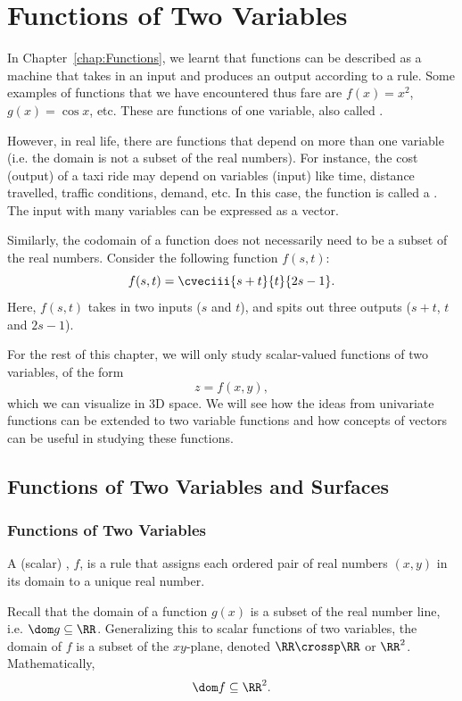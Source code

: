 \chapter{Functions of Two Variables}

In Chapter~\SS\ref{chap:Functions}, we learnt that functions can be described as a machine that takes in an input and produces an output according to a rule. Some examples of functions that we have encountered thus fare are $f(x) = x^2$, $g(x) = \cos x$, etc. These are functions of one variable, also called .

However, in real life, there are functions that depend on more than one variable (i.e. the domain is not a subset of the real numbers). For instance, the cost (output) of a taxi ride may depend on variables (input) like time, distance travelled, traffic conditions, demand, etc. In this case, the function is called a . The input with many variables can be expressed as a vector. 

Similarly, the codomain of a function does not necessarily need to be a subset of the real numbers. Consider the following function $f(s, t)$: \[f(s, t) = \cveciii{s + t}{t}{2s - 1}.\] Here, $f(s, t)$ takes in two inputs ($s$ and $t$), and spits out three outputs ($s + t$, $t$ and $2s - 1$).

For the rest of this chapter, we will only study scalar-valued functions of two variables, of the form \[z = f(x, y),\] which we can visualize in 3D space. We will see how the ideas from univariate functions can be extended to two variable functions and how concepts of vectors can be useful in studying these functions.

\section{Functions of Two Variables and Surfaces}

\subsection{Functions of Two Variables}

\begin{definition}
    A (scalar) , $f$, is a rule that assigns each ordered pair of real numbers $(x, y)$ in its domain to a unique real number.
\end{definition}

Recall that the domain of a function $g(x)$ is a subset of the real number line, i.e. $\dom g \subseteq \RR$. Generalizing this to scalar functions of two variables, the domain of $f$ is a subset of the $xy$-plane, denoted $\RR \crossp \RR$ or $\RR ^2$. Mathematically, \[\dom f \subseteq \RR^2.\]

